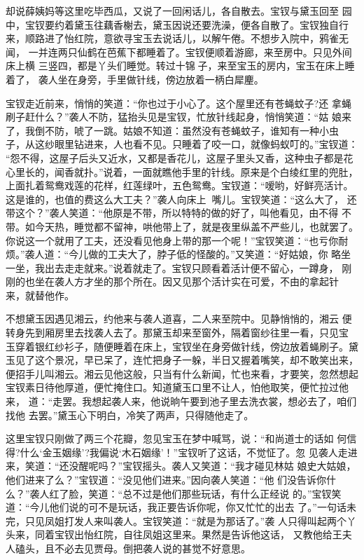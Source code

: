 却说薛姨妈等这里吃毕西瓜，又说了一回闲话儿，各自散去。宝钗与黛玉回至
园中，宝钗要约着黛玉往藕香榭去，黛玉因说还要洗澡，便各自散了。宝钗独自行
来，顺路进了怡红院，意欲寻宝玉去说话儿，以解午倦。不想步入院中，鸦雀无闻，
一并连两只仙鹤在芭蕉下都睡着了。宝钗便顺着游廊，来至房中。只见外间床上横
三竖四，都是丫头们睡觉。转过十锦子，来至宝玉的房内，宝玉在床上睡着了，
袭人坐在身旁，手里做针线，傍边放着一柄白犀麈。

宝钗走近前来，悄悄的笑道：“你也过于小心了。这个屋里还有苍蝇蚊子?还
拿蝇刷子赶什么？”袭人不防，猛抬头见是宝钗，忙放针线起身，悄悄笑道：“姑
娘来了，我倒不防，唬了一跳。姑娘不知道：虽然没有苍蝇蚊子，谁知有一种小虫
子，从这纱眼里钻进来，人也看不见。只睡着了咬一口，就像蚂蚁叮的。”宝钗道：
“怨不得，这屋子后头又近水，又都是香花儿，这屋子里头又香，这种虫子都是花
心里长的，闻香就扑。”说着，一面就瞧他手里的针线。原来是个白绫红里的兜肚，
上面扎着鸳鸯戏莲的花样，红莲绿叶，五色鸳鸯。宝钗道：“嗳哟，好鲜亮活计。
这是谁的，也值的费这么大工夫？”袭人向床上嘴儿。宝钗笑道：“这么大了，
还带这个？”袭人笑道：“他原是不带，所以特特的做的好了，叫他看见，由不得
不带。如今天热，睡觉都不留神，哄他带上了，就是夜里纵盖不严些儿，也就罢了。
你说这一个就用了工夫，还没看见他身上带的那一个呢！”宝钗笑道：“也亏你耐
烦。”袭人道：“今儿做的工夫大了，脖子低的怪酸的。”又笑道：“好姑娘，你
略坐一坐，我出去走走就来。”说着就走了。宝钗只顾看着活计便不留心，一蹲身，
刚刚的也坐在袭人方才坐的那个所在。因又见那个活计实在可爱，不由的拿起针
来，就替他作。

不想黛玉因遇见湘云，约他来与袭人道喜，二人来至院中。见静悄悄的，湘云
便转身先到厢房里去找袭人去了。那黛玉却来至窗外，隔着窗纱往里一看，只见宝
玉穿着银红纱衫子，随便睡着在床上，宝钗坐在身旁做针线，傍边放着蝇刷子。黛
玉见了这个景况，早已呆了，连忙把身子一躲，半日又握着嘴笑，却不敢笑出来，
便招手儿叫湘云。湘云见他这般，只当有什么新闻，忙也来看，才要笑，忽然想起
宝钗素日待他厚道，便忙掩住口。知道黛玉口里不让人，怕他取笑，便忙拉过他来，
道：“走罢。我想起袭人来，他说晌午要到池子里去洗衣裳，想必去了，咱们找他
去罢。”黛玉心下明白，冷笑了两声，只得随他走了。

这里宝钗只刚做了两三个花瓣，忽见宝玉在梦中喊骂，说：“和尚道士的话如
何信得?什么‘金玉姻缘’?我偏说‘木石姻缘’！”宝钗听了这话，不觉怔了。忽
见袭人走进来，笑道：“还没醒呢吗？”宝钗摇头。袭人又笑道：“我才碰见林姑
娘史大姑娘，他们进来了么？”宝钗道：“没见他们进来。”因向袭人笑道：“他
们没告诉你什么？”袭人红了脸，笑道：“总不过是他们那些玩话，有什么正经说
的。”宝钗笑道：“今儿他们说的可不是玩话，我正要告诉你呢，你又忙忙的出去
了。”一句话未完，只见凤姐打发人来叫袭人。宝钗笑道：“就是为那话了。”袭
人只得叫起两个丫头来，同着宝钗出怡红院，自往凤姐这里来。果然是告诉他这话，
又教他给王夫人磕头，且不必去见贾母。倒把袭人说的甚觉不好意思。

